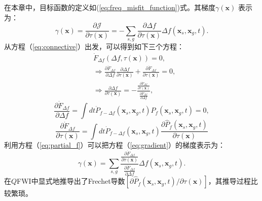在本章中，目标函数的定义如(\ref{eq:freq_misfit_function})式。其梯度$\gamma(\mathbf{x})$
表示为：
\begin{equation}
	\gamma(\mathbf{x})=\frac{\partial\mathcal{J}}{\partial \tau(\mathbf{x})}
	=-\sum_{s,g}\frac{\partial \Delta f}{\partial \tau(\mathbf{x})}
	\Delta f(\mathbf{x}_s,\mathbf{x}_g,t).
	\label{eq:gradient}
\end{equation}
从方程（\ref{eq:connective}）出发，可以得到如下三个方程：
\begin{equation}
	\begin{aligned}
		 &\dot{F}_{\Delta f}(\Delta f,\tau(\mathbf{x}))=0, \\
		&\Rightarrow \frac{\partial \dot{F}_{\Delta f}}{\partial \Delta f} 
		\frac{\partial \Delta f}{\partial \tau(\mathbf{x})} + 
		\frac{\partial \dot{F}_{\Delta f}}{\partial\tau(\mathbf{x})} =0, \\
		&\Rightarrow \frac{\partial \Delta f}{\partial \tau(\mathbf{x})} =
		-\frac{\frac{\partial \dot{F}_{\Delta f}}{\partial\tau(\mathbf{x})}}
		{\frac{\partial \dot{F}_{\Delta f}}{\partial \Delta f}},
	\end{aligned}
	\label{eq:partial_f}
\end{equation}
\begin{equation}
	\frac{\partial \dot{F}_{\Delta f}}{\partial \Delta f} = \int dt 
	\ddot{P}_{f-\Delta f}(\mathbf{x}_s,\mathbf{x}_g,t)
	\hat{P}_f(\mathbf{x}_s,\mathbf{x}_g,t)=0,
\end{equation}
\begin{equation}
	\frac{\partial \dot{F}_{\Delta f}}{\partial\tau(\mathbf{x})} = \int dt
	\dot{P}_{f-\Delta f}(\mathbf{x}_s,\mathbf{x}_g,t) 
	\frac{\partial \hat{P}_f(\mathbf{x}_s,\mathbf{x}_g,t)}{\partial \tau(\mathbf{x})}
\end{equation}
利用方程（\ref{eq:partial_f}）可以把方程（\ref{eq:gradient}）的梯度表示为：
\begin{equation}
	\gamma(\mathbf{x})=\sum_{s,g}\frac{\frac{\partial \dot{F}_{\Delta f}}{\partial\tau(\mathbf{x})}}
	{\frac{\partial \dot{F}_{\Delta f}}{\partial \Delta f}}\Delta f(\mathbf{x}_s,\mathbf{x}_g,t).
\end{equation}
在$Q$FWI中显式地推导出了Frechet导数$[\partial \hat{P}_f(\mathbf{x}_s,
\mathbf{x}_g,t)/\partial \tau(\mathbf{x})]$，其推导过程比较繁琐。

